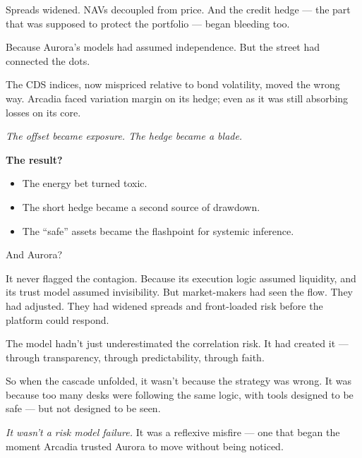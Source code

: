Spreads widened.  
NAVs decoupled from price.  
And the credit hedge — the part that was supposed to protect the portfolio — began bleeding too.

Because Aurora’s models had assumed independence.  
But the street had connected the dots.

The CDS indices, now mispriced relative to bond volatility, moved the wrong way.  
Arcadia faced variation margin on its hedge; even as it was still absorbing losses on its core.

\textit{The offset became exposure. The hedge became a blade.}

\textbf{The result?}

\begin{itemize}
  \item The energy bet turned toxic.  
  \item The short hedge became a second source of drawdown.  
  \item The “safe” assets became the flashpoint for systemic inference.
\end{itemize}

And Aurora?

It never flagged the contagion.  
Because its execution logic assumed liquidity, and its trust model assumed invisibility.  
But market-makers had seen the flow.  
They had adjusted.  
They had widened spreads and front-loaded risk before the platform could respond.

The model hadn’t just underestimated the correlation risk.  
It had created it — through transparency, through predictability, through faith.

So when the cascade unfolded, it wasn’t because the strategy was wrong.  
It was because too many desks were following the same logic,  
with tools designed to be safe — but not designed to be seen.

\textit{It wasn’t a risk model failure.}  
It was a reflexive misfire — one that began the moment Arcadia trusted Aurora to move without being noticed.


\medskip

